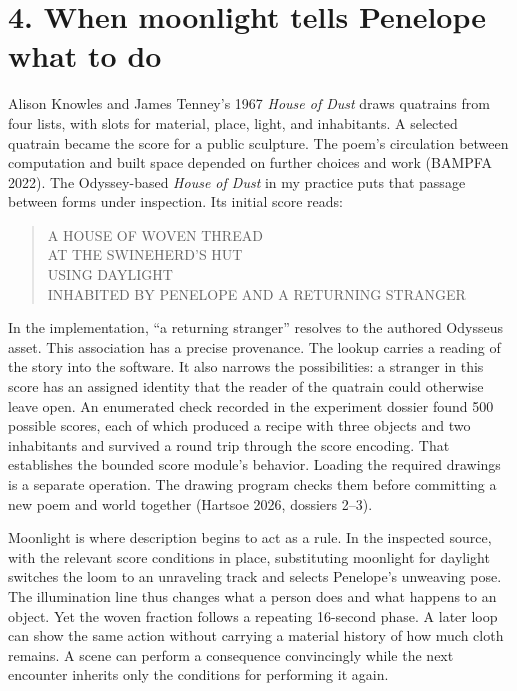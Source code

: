 \documentclass[
  11pt,
  letterpaper,
]{article}
\begin{document}
\hypertarget{when-moonlight-tells-penelope-what-to-do}{%
\section{4. When moonlight tells Penelope what to
do}\label{when-moonlight-tells-penelope-what-to-do}}

Alison Knowles and James Tenney's 1967 \emph{House of Dust} draws
quatrains from four lists, with slots for material, place, light, and
inhabitants. A selected quatrain became the score for a public
sculpture. The poem's circulation between computation and built space
depended on further choices and work (BAMPFA 2022). The Odyssey-based
\emph{House of Dust} in my practice puts that passage between forms
under inspection. Its initial score reads:

\begin{quote}
A HOUSE OF WOVEN THREAD\\
AT THE SWINEHERD'S HUT\\
USING DAYLIGHT\\
INHABITED BY PENELOPE AND A RETURNING STRANGER
\end{quote}

In the implementation, ``a returning stranger'' resolves to the authored
Odysseus asset. This association has a precise provenance. The lookup
carries a reading of the story into the software. It also narrows the
possibilities: a stranger in this score has an assigned identity that
the reader of the quatrain could otherwise leave open. An enumerated
check recorded in the experiment dossier found 500 possible scores, each
of which produced a recipe with three objects and two inhabitants and
survived a round trip through the score encoding. That establishes the
bounded score module's behavior. Loading the required drawings is a
separate operation. The drawing program checks them before committing a
new poem and world together (Hartsoe 2026, dossiers 2--3).

Moonlight is where description begins to act as a rule. In the inspected
source, with the relevant score conditions in place, substituting
moonlight for daylight switches the loom to an unraveling track and
selects Penelope's unweaving pose. The illumination line thus changes
what a person does and what happens to an object. Yet the woven fraction
follows a repeating 16-second phase. A later loop can show the same
action without carrying a material history of how much cloth remains. A
scene can perform a consequence convincingly while the next encounter
inherits only the conditions for performing it again.
\end{document}
